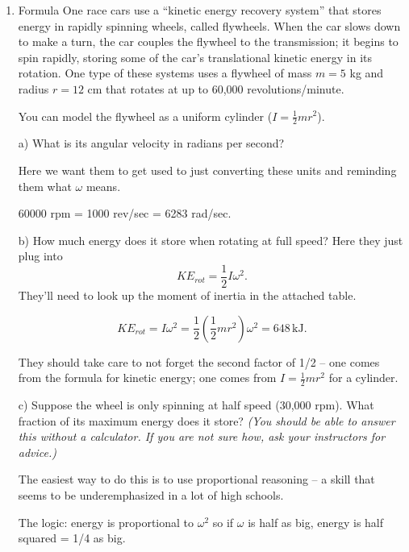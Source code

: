 \documentclass[12pt]{article}
\begin{document}
\Large
\centerline{}
\normalsize
\centerline{}


\begin{enumerate}

\item {Formula One race cars use a ``kinetic energy recovery system'' that stores energy in rapidly spinning wheels, called flywheels. When the car slows down to make a turn, the car couples the flywheel to the transmission; it begins to spin rapidly, storing some of the car's translational kinetic energy in its rotation. One type of these systems uses a flywheel of mass $m=5$ kg and radius $r=12$ cm that rotates at up to 60,000 revolutions/minute.

You can model the flywheel as a uniform cylinder ($I=\frac{1}{2}mr^2$).


a) What is its angular velocity in radians per second?

{\color{red} Here we want them to get used to just converting these units and reminding them what $\omega$ means.}

{\color{blue} 60000 rpm = 1000 rev/sec = 6283 rad/sec.}

b) How much energy does it store when rotating at full speed?
{\color{red} Here they just plug into $$KE_{rot} = \frac{1}{2}I \omega^2.$$ They'll need to look up the moment of inertia in the attached table.}

{\color{blue}$$KE_{rot} = I \omega^2 = \frac{1}{2} \left(\frac{1}{2}mr^2\right) \omega^2 = 648\,\text{kJ}.$$ 

They should take care to not forget the second factor of 1/2 -- one comes from the formula for kinetic energy; one comes from $I=\frac{1}{2}mr^2$ for a cylinder. }


c) Suppose the wheel is only spinning at half speed (30,000 rpm). What fraction of its maximum energy does it store? \textit{(You should be able to answer this without a calculator. If you are not sure how, ask your instructors for advice.)}

{\color{red} The easiest way to do this is to use proportional reasoning -- a skill that seems to be underemphasized in a lot of high schools.}

{\color{blue} The logic: energy is proportional to $\omega^2$ so if $\omega$ is half as big, energy is half squared = 1/4 as big.}



}
\end{enumerate}
\end{document}

